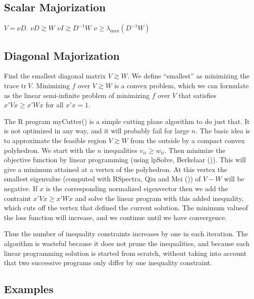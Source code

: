\documentclass[
  12pt,
  letterpaper,
  DIV=11,
  numbers=noendperiod]{scrartcl}
\theoremstyle{plain}
\theoremstyle{remark}
\begin{document}
\subsection{Scalar Majorization}\label{scalar-majorization}

\(V=\nu D\). \(\nu D\gtrsim W\) \(\nu I\gtrsim D^{-1}W\)
\(\nu\geq\lambda_{\text{max}}(D^{-1}W)\)

\subsection{Diagonal Majorization}\label{diagonal-majorization}

Find the smallest diagonal matrix \(V\gtrsim W\). We define ``smallest''
as minimizing the trace \(\text{tr}\ V\). Minimizing \(f\) over
\(V\gtrsim W\) is a convex problem, which we can formulate as the linear
semi-infinite problem of minimizing \(f\) over \(V\) that satisfies
\(x'Vx\geq x'Wx\) for all \(x'x=1\).

The R program myCutter() is a simple cutting plane algorithm to do just
that. It is not optimized in any way, and it will probably fail for
large \(n\). The basic idea is to approximate the feasible region
\(V\gtrsim W\) from the outside by a compact convex polyhedron. We start
with the \(n\) inequalities \(v_{ii}\geq w_{ii}\). Then minimize the
objective function by linear programming (using lpSolve, Berkelaar
()). This will give a minimum attained
at a vertex of the polyhedron. At this vertex the smallest eigenvalue
(computed with RSpectra, Qiu and Mei ())
of \(V-W\) will be negative. If \(x\) is the corresponding normalized
eigenvector then we add the contraint \(x'Vx\geq x'Wx\) and solve the
linear program with this added inequality, which cuts off the vertex
that defined the current solution. The minimum valueof the loss function
will increase, and we continue until we have convergence.

Thus the number of inequality constraints increases by one in each
iteration. The algorithm is wasteful because it does not prune the
inequalities, and because each linear programming solution is started
from scratch, without taking into account that two successive programs
only differ by one inequality constraint.

\subsection{Examples}\label{examples}
\end{document}
